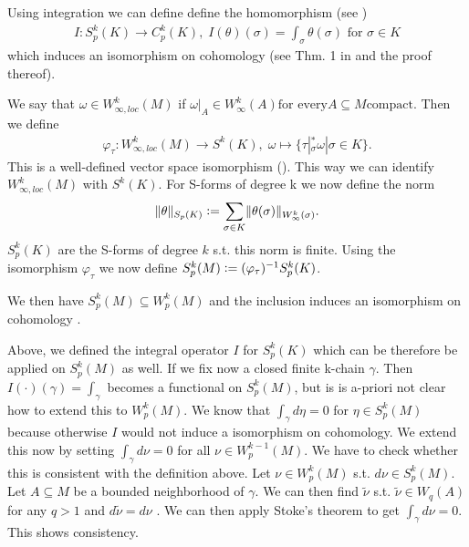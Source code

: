 \documentclass[12pt,a4paper]{article}
\begin{document}
Using integration we can define define the homomorphism 
(see \cite[p.191]{goldshtein})
\begin{align*}
I: S_p^k(K) \rightarrow C_p^k(K), \; I(\theta)(\sigma) = 
\int_\sigma \theta(\sigma) \text{ for } \sigma \in K
\end{align*}
which induces an isomorphism on cohomology (see Thm. 1 in \cite{goldshtein}
and the proof thereof).

We say that $\omega \in W^k_{\infty,loc}(M)$ 
if $\omega|_A \in W^k_\infty(A) \text{for every} A \subseteq M \text{compact}$.
Then we define 
\begin{align*}
\varphi_\tau: W^k_{\infty,loc}(M) \rightarrow S^k(K), \;
\omega \mapsto \{ \tau|_\sigma^*\omega | \sigma \in K \}.
\end{align*}
This is a well-defined vector space isomorphism (\cite[p.191]{goldshtein}). This
way we can identify $W^k_{\infty,loc}(M)$ with $S^k(K)$. For S-forms of 
degree k we now define the norm
\begin{align*}
\lVert \theta \rVert _{S_p(K)}  \vcentcolon= \sum_{\sigma \in K} 
\lVert \theta(\sigma) \rVert _{W^k_\infty(\sigma)}.
\end{align*} 
$S^k_p(K)$ are the S-forms of degree $k$ s.t. this norm is finite. Using the
isomorphism $\varphi_\tau$ we now define 
$S^k_p(M) \vcentcolon= (\varphi_\tau)^{-1} S^k_p(K)$.

We then have $S^k_p(M) \subseteq W^k_p(M)$ and the inclusion induces an
isomorphism on cohomology \cite[Lemma 4, Corollary]{goldshtein}. 


Above, we defined the integral operator $I$ for $S^k_p(K)$ which can be 
therefore be applied on $S^k_p(M)$ as well. If we fix now a closed finite 
k-chain $\gamma$. Then $I(\cdot)(\gamma) = \int_\gamma$ becomes a functional on
$S^k_p(M)$, but is is a-priori not clear how to extend this to $W_p^k(M)$. 
We know that $\int_\gamma d\eta = 0$ for $\eta \in S^k_p(M)$ because 
otherwise $I$ would not induce a isomorphism on cohomology. We extend this now
by setting $\int_\gamma d\nu = 0$ for all $\nu \in W^{k-1}_p(M)$. 
We have to check whether this is consistent with the definition above. 
Let $\nu \in W_p^k(M)$ s.t. $d\nu \in S^k_p(M)$. Let $A \subseteq M$ be a 
bounded neighborhood of $\gamma$. We can then find 
$\tilde{\nu}$ s.t.  $\tilde{\nu} \in W_q(A)$ for any $q > 1$ and 
$d\tilde{\nu} = d\nu$ \cite[Thm 3.1.1]{schwarz}. We can then apply 
Stoke's theorem \cite[Thm. 9]{goldshtein_integration} to get  
$\int_\gamma d\nu = 0$. This shows consistency.
\end{document}
